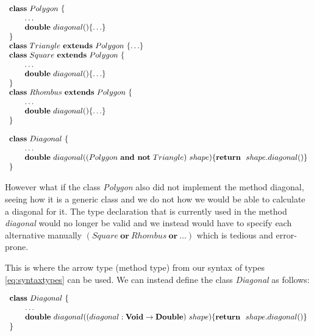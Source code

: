 \documentclass{l4proj}
\begin{document}
\begin{equation}
    \begin{array}{l}
        \synclass Polygon \ \{
        \\
        \qquad \ldots
        \\ \qquad \textbf{double}\ diagonal()\{\ldots\} \\ \}
        \\
        \syndecl{Triangle}{Polygon} {\ldots}
        \\
        \syndecl{Square}{Polygon} {
            \\
            \qquad \ldots

            \\ \qquad \textbf{double}\ diagonal()\{\ldots\} \\ }
        \\
        \syndecl{Rhombus}{Polygon} {
            \\
            \qquad \ldots

            \\ \qquad \textbf{double}\ diagonal()\{\ldots\} \\ }
        \\
        \\
        \synclass Diagonal \ \{
        \\
        \qquad \ldots \\
        \qquad \textbf{double}\ diagonal((Polygon\ \textbf{and not}\ Triangle) \ shape)\{\synret\ shape.diagonal()\}
        \\
        \}
    \end{array}
\end{equation}

However what if the class \emph{Polygon} also did not implement the method diagonal, seeing how it is a generic class and we do not how we would be able to calculate a diagonal for it.
The type declaration that is currently used in the method \emph{diagonal} would no longer be valid and we instead would have to specify each alternative manually $(Square\ \textbf{or}\ Rhombus\ \textbf{or}\ \ldots)$ which is tedious and error-prone.

This is where the arrow type (method type) from our syntax of types \ref{eq:syntaxtypes} can be used. We can instead define the class \emph{Diagonal} as follows:

\begin{equation}
    \begin{array}{l}
        \mathbf{class} \  Diagonal \ \{
        \\
        \qquad \ldots \\
        \qquad \textbf{double}\ diagonal((diagonal: \textbf{Void} \rightarrow \textbf{Double})\ shape)\{\mathbf{return}\ \ shape.diagonal()\}
        \\
        \}
    \end{array}
\end{equation}
\end{document}
